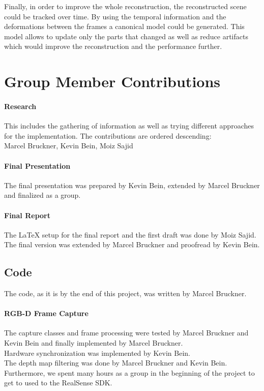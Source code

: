 \documentclass[10pt,twocolumn,letterpaper]{article}
\begin{document}
Finally, in order to improve the whole reconstruction, the reconstructed scene could be tracked over time. By using the temporal information and the deformations between the frames a canonical model could be generated. This model allows to update only the parts that changed as well as reduce artifacts which would improve the reconstruction and the performance further.

\section{Group Member Contributions}
\paragraph{Research}
This includes the gathering of information as well as trying different approaches for the implementation. The contributions are ordered descending:\\
Marcel Bruckner, Kevin Bein, Moiz Sajid

\paragraph{Final Presentation}
The final presentation was prepared by Kevin Bein, extended by Marcel Bruckner and finalized as a group.

\paragraph{Final Report}
The \LaTeX{} setup for the final report and the first draft was done by Moiz Sajid. The final version was extended by Marcel Bruckner and proofread by Kevin Bein.

\subsection{Code}
The code, as it is by the end of this project, was written by Marcel Bruckner.
\paragraph{RGB-D Frame Capture}
The capture classes and frame processing were tested by Marcel Bruckner and Kevin Bein and finally implemented by Marcel Bruckner.\\
Hardware synchronization was implemented by Kevin Bein.\\
The depth map filtering was done by Marcel Bruckner and Kevin Bein.\\
Furthermore, we spent many hours as a group in the beginning of the project to get to used to the RealSense SDK. 
\end{document}
